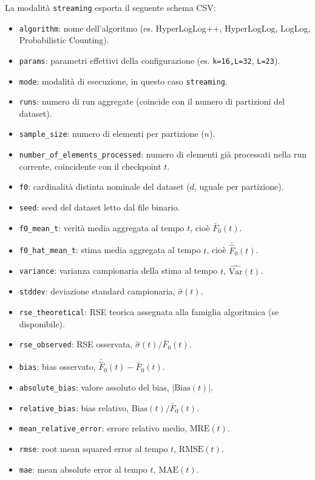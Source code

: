 La modalità \texttt{streaming} esporta il seguente schema CSV:

\begin{itemize}
    \item \texttt{algorithm}: nome dell'algoritmo (es. HyperLogLog++, HyperLogLog, LogLog, Probabilistic Counting).
    \item \texttt{params}: parametri effettivi della configurazione (es. \texttt{k=16,L=32}, \texttt{L=23}).
    \item \texttt{mode}: modalità di esecuzione, in questo caso \texttt{streaming}.
    \item \texttt{runs}: numero di run aggregate (coincide con il numero di partizioni del dataset).
    \item \texttt{sample\_size}: numero di elementi per partizione (\(n\)).
    \item \texttt{number\_of\_elements\_processed}: numero di elementi già processati nella run corrente, coincidente con il checkpoint \(t\).
    \item \texttt{f0}: cardinalità distinta nominale del dataset (\(d\), uguale per partizione).
    \item \texttt{seed}: seed del dataset letto dal file binario.
    \item \texttt{f0\_mean\_t}: verità media aggregata al tempo \(t\), cioè \(\bar{F}_0(t)\).
    \item \texttt{f0\_hat\_mean\_t}: stima media aggregata al tempo \(t\), cioè \(\bar{\hat{F}}_0(t)\).
    \item \texttt{variance}: varianza campionaria della stima al tempo \(t\), \(\widehat{\mathrm{Var}}(t)\).
    \item \texttt{stddev}: deviazione standard campionaria, \(\widehat{\sigma}(t)\).
    \item \texttt{rse\_theoretical}: RSE teorica assegnata alla famiglia algoritmica (se disponibile).
    \item \texttt{rse\_observed}: RSE osservata, \(\widehat{\sigma}(t)/\bar{F}_0(t)\).
    \item \texttt{bias}: bias osservato, \(\bar{\hat{F}}_0(t)-\bar{F}_0(t)\).
    \item \texttt{absolute\_bias}: valore assoluto del bias, \(|\mathrm{Bias}(t)|\).
    \item \texttt{relative\_bias}: bias relativo, \(\mathrm{Bias}(t)/\bar{F}_0(t)\).
    \item \texttt{mean\_relative\_error}: errore relativo medio, \(\mathrm{MRE}(t)\).
    \item \texttt{rmse}: root mean squared error al tempo \(t\), \(\mathrm{RMSE}(t)\).
    \item \texttt{mae}: mean absolute error al tempo \(t\), \(\mathrm{MAE}(t)\).
\end{itemize}

